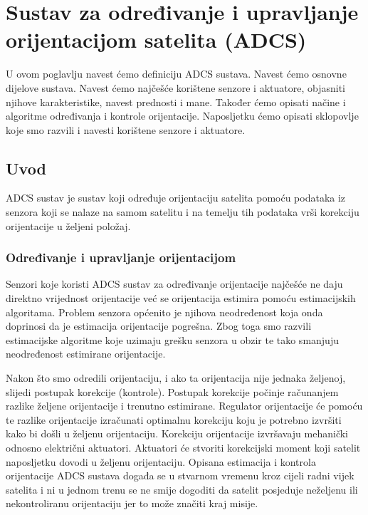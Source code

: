 \documentclass[times, utf8, diplomski, numeric]{templates/template}
\begin{document}
\chapter{Sustav za određivanje i upravljanje orijentacijom satelita (ADCS)}{
    U ovom poglavlju navest ćemo definiciju ADCS  sustava. Navest ćemo osnovne dijelove sustava. Navest ćemo najčešće korištene senzore i aktuatore, objasniti njihove karakteristike, navest prednosti i mane. Također ćemo opisati načine i algoritme određivanja i kontrole orijentacije. Naposljetku ćemo opisati sklopovlje koje smo razvili i navesti korištene senzore i aktuatore. 

    \section{Uvod}{
        ADCS  sustav je sustav koji određuje orijentaciju satelita pomoću podataka iz senzora koji se nalaze na samom satelitu i na temelju tih podataka vrši korekciju orijentacije u željeni položaj. 

        \subsection{Određivanje i upravljanje orijentacijom}{
            Senzori koje koristi ADCS sustav za određivanje orijentacije najčešće ne daju direktno vrijednost orijentacije već se orijentacija estimira pomoću estimacijskih algoritama. Problem senzora općenito je njihova neodređenost koja onda doprinosi da je estimacija orijentacije pogrešna. Zbog toga smo razvili estimacijske algoritme koje uzimaju grešku senzora u obzir te tako smanjuju neodređenost estimirane orijentacije.

            Nakon što smo odredili orijentaciju, i ako ta orijentacija nije jednaka željenoj, slijedi postupak korekcije (kontrole). Postupak korekcije počinje računanjem razlike željene orijentacije i trenutno estimirane. Regulator orijentacije će pomoću te razlike orijentacije izračunati optimalnu korekciju koju je potrebno izvršiti kako bi došli u željenu orijentaciju. Korekciju orijentacije izvršavaju mehanički odnosno električni aktuatori. Aktuatori će stvoriti korekcijski moment koji satelit naposljetku dovodi u željenu orijentaciju.
            Opisana estimacija i kontrola orijentacije ADCS sustava događa se u stvarnom vremenu kroz cijeli radni vijek satelita i ni u jednom trenu se ne smije dogoditi da satelit posjeduje neželjenu ili nekontroliranu orijentaciju jer to može značiti kraj misije.
        }

}}
\end{document}
